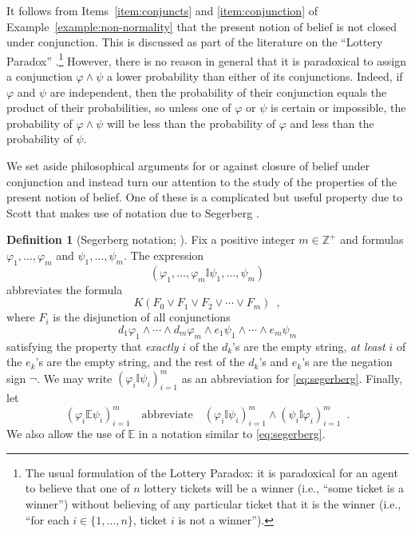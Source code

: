 \documentclass[12pt]{article}
\theoremstyle{definition}
\newtheorem{definition}[theorem]{Definition}
\newcommand{\Int}{\mathbb{Z}}  %
\begin{document}
It follows from Items~\ref{item:conjuncts} and \ref{item:conjunction}
of Example~\ref{example:non-normality} that the present notion of
belief is not closed under conjunction.  This is discussed as part of
the literature on the ``Lottery Paradox''
\cite{Kyburg1961:patlorb}.\footnote{The usual formulation of the
  Lottery Paradox: it is paradoxical for an agent to believe that one
  of $n$ lottery tickets will be a winner (i.e., ``some ticket is a
  winner'') without believing of any particular ticket that it is the
  winner (i.e., ``for each $i\in\{1,\dots,n\}$, ticket $i$ is not a
  winner'').}  However, there is no reason in general that it is
paradoxical to assign a conjunction $\varphi \land \psi$ a lower
probability than either of its conjunctions.  Indeed, if $\varphi$ and
$\psi$ are independent, then the probability of their conjunction
equals the product of their probabilities, so unless one of $\varphi$ or
$\psi$ is certain or impossible, the probability of $\varphi \land \psi$
will be less than the probability of $\varphi$ and less than the
probability of $\psi$.

We set aside philosophical arguments for or against closure of belief
under conjunction and instead turn our attention to the study of the
properties of the present notion of belief.  One of these is a
complicated but useful property due to Scott \cite{Sco64:JMP} that
makes use of notation due to Segerberg \cite{Segerberg1971:qpiams}.

\begin{definition}[Segerberg notation; \cite{Segerberg1971:qpiams}]
  \label{definition:segerberg-notation}
  Fix a positive integer $m\in\Int^+$ and formulas
  $\varphi_1,\dots,\varphi_m$ and $\psi_1,\dots,\psi_m$.  The expression
  \begin{equation}
    (\varphi_1,\dots,\varphi_m\mathbb{I}\psi_1,\dots,\psi_m)
    \label{eq:segerberg}
  \end{equation}
  abbreviates the formula
  \[
  K(F_0\lor F_1\lor F_2 \lor \cdots \lor F_m)\enspace,
  \]
  where $F_i$ is the disjunction of all conjunctions
  \[
  d_1\varphi_1\land\cdots\land d_m\varphi_m \land
  e_1\psi_1\land\cdots\land e_m\psi_m
  \]
  satisfying the property that \emph{exactly} $i$ of the $d_k$'s are
  the empty string, \emph{at least} $i$ of the $e_k$'s are the empty
  string, and the rest of the $d_k$'s and $e_k$'s are the negation
  sign $\lnot$.  We may write $(\varphi_i\mathbb{I}\psi_i)_{i=1}^m$ as
  an abbreviation for \eqref{eq:segerberg}.  Finally, let
  \[
  (\varphi_i\mathbb{E}\psi_i)_{i=1}^m
  \quad\text{abbreviate}\quad
  (\varphi_i\mathbb{I}\psi_i)_{i=1}^m\land(\psi_i\mathbb{I}\varphi_i)_{i=1}^m
  \enspace.
  \]
  We also allow the use of $\mathbb{E}$ in a notation similar to
  \eqref{eq:segerberg}.
\end{definition}
\end{document}
